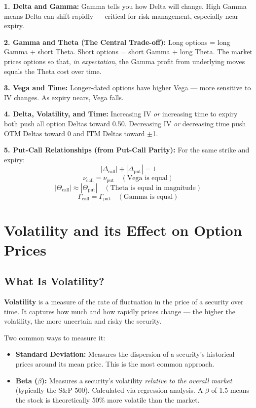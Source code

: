 \documentclass[12pt,openany]{book}
\begin{document}
\textbf{1. Delta and Gamma:}
Gamma tells you how Delta will change. High Gamma means Delta can shift rapidly — critical for risk management, especially near expiry.

\textbf{2. Gamma and Theta (The Central Trade-off):}
Long options = long Gamma + short Theta. Short options = short Gamma + long Theta.
The market prices options so that, \emph{in expectation}, the Gamma profit from underlying moves equals the Theta cost over time.

\textbf{3. Vega and Time:}
Longer-dated options have higher Vega — more sensitive to IV changes. As expiry nears, Vega falls.

\textbf{4. Delta, Volatility, and Time:}
Increasing IV \emph{or} increasing time to expiry both push all option Deltas toward 0.50.
Decreasing IV \emph{or} decreasing time push OTM Deltas toward 0 and ITM Deltas toward \(\pm\)1.

\textbf{5. Put-Call Relationships (from Put-Call Parity):}
For the same strike and expiry:
\[
|\Delta_{\text{call}}| + |\Delta_{\text{put}}| = 1
\]
\[
\nu_{\text{call}} = \nu_{\text{put}} \quad (\text{Vega is equal})
\]
\[
|\Theta_{\text{call}}| \approx |\Theta_{\text{put}}| \quad (\text{Theta is equal in magnitude})
\]
\[
\Gamma_{\text{call}} = \Gamma_{\text{put}} \quad (\text{Gamma is equal})
\]

\section{Volatility and its Effect on Option Prices}

\subsection{What Is Volatility?}

\textbf{Volatility} is a measure of the rate of fluctuation in the price of a security over time. It captures how much and how rapidly prices change — the higher the volatility, the more uncertain and risky the security.

Two common ways to measure it:

\begin{itemize}[leftmargin=*]
    \item \textbf{Standard Deviation:} Measures the dispersion of a security's historical prices around its mean price. This is the most common approach.
    \item \textbf{Beta (\(\beta\)):} Measures a security's volatility \emph{relative to the overall market} (typically the S\&P 500). Calculated via regression analysis. A \(\beta\) of 1.5 means the stock is theoretically 50\% more volatile than the market.
\end{itemize}
\end{document}
